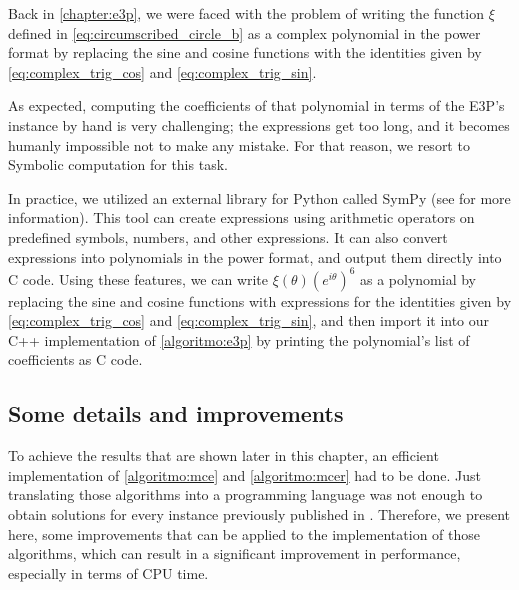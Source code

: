 Back in \autoref{chapter:e3p}, we were faced with the problem of writing the function $\xi$ defined in \autoref{eq:circumscribed_circle_b} as a complex polynomial in the power format by replacing the sine and cosine functions with the identities given by  \autoref{eq:complex_trig_cos} and \autoref{eq:complex_trig_sin}.

As expected, computing the coefficients of that polynomial in terms of the E3P's instance by hand is very challenging; the expressions get too long, and it becomes humanly impossible not to make any mistake. 
For that reason, we resort to Symbolic computation for this task.

In practice, we utilized an external library for Python called SymPy (see  for more information).
This tool can create expressions using arithmetic operators on predefined symbols, numbers, and other expressions. It can also convert expressions into polynomials in the power format, and output them directly into C code. Using these features, we can write $\xi(\theta)(e^{i\theta})^6$ as a polynomial by replacing the sine and cosine functions with expressions for the identities given by  \autoref{eq:complex_trig_cos} and \autoref{eq:complex_trig_sin}, and then import it into our C++ implementation of \autoref{algoritmo:e3p} by printing the polynomial's list of coefficients as C code.


\subsection{Some details and improvements}\label{section:improvements}

To achieve the results that are shown later in this chapter, an efficient implementation of \autoref{algoritmo:mce} and \autoref{algoritmo:mcer} had to be done. Just translating those algorithms into a programming language was not enough to obtain solutions for every instance previously published in .
Therefore, we present here, some improvements that can be applied to the implementation of those algorithms, which can result in a significant improvement in performance, especially in terms of CPU time.

